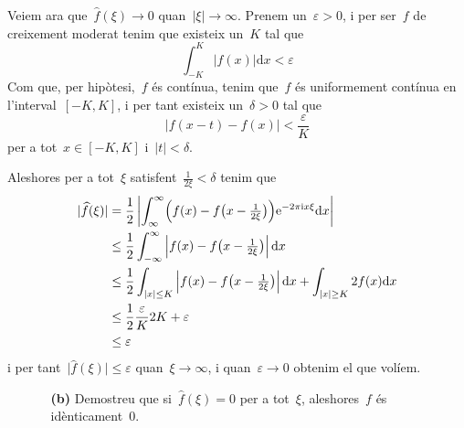 \documentclass[a4paper]{article}
\theoremstyle{definition}
\newcommand{\iu}{\mathrm{i}}
\newcommand{\e}{\mathrm{e}}
\providecommand{\uppi}{\pi}
\newcommand{\diff}{\mathrm{d}}
\newcommand{\abs}[1]{\lvert{#1}\rvert}
\newcommand{\Abs}[1]{\left\lvert{#1}\right\rvert}
\begin{document}
Veiem ara que~\(\widehat{f}(\xi)\to0\) quan~\(\abs{\xi}\to\infty\).
Prenem un~\(\varepsilon>0\), i per ser~\(f\) de creixement moderat tenim que
existeix un~\(K\) tal que
\[
    \int_{-K}^{K} \abs{f(x)} \diff x < \varepsilon
\]
Com que, per hipòtesi,~\(f\) és contínua, tenim que~\(f\) és uniformement
contínua en l'interval~\([-K,K]\), i per tant existeix un~\(\delta>0\) tal que
\[
    \abs{f(x - t) - f(x)} < \frac{\varepsilon}{K}
\]
per a tot~\(x\in[-K,K]\) i~\(\abs{t}<\delta\).

Aleshores per a tot~\(\xi\) satisfent~\(\frac{1}{2\xi}<\delta\) tenim que
\begin{align*}
    \abs{\widehat{f}(\xi)} &= \frac{1}{2} \Abs{\int_{\infty}^{\infty}
                              \Bigl(
                                  f(x) - f\bigl(
                                      x - {\textstyle\frac{1}{2\xi}}
                                  \bigr)
                              \Bigr)
                              \e^{-2\uppi\iu x\xi}
                              \diff x} \\
                           &\leq \frac{1}{2} \int_{-\infty}^{\infty}
                              \Abs{f(x) - f\bigl(
                                      x - {\textstyle\frac{1}{2\xi}}
                              \bigr)}
                              \diff x \\
                           &\leq \frac{1}{2} \int_{\abs{x}\leq K}
                              \Abs{f(x) - f\bigl(
                                      x - {\textstyle\frac{1}{2\xi}}
                              \bigr)}
                              \diff x
                              +
                              \int_{\abs{x}\geq K}
                              2f(x)
                              \diff x \\
                           &\leq \frac{1}{2}
                              \frac{\varepsilon}{K}2K
                              +\varepsilon \\
                           &\leq \varepsilon
\end{align*}
i per tant~\(\abs{\widehat{f}(\xi)} \leq \varepsilon\) quan~\(\xi\to\infty\), i
quan~\(\varepsilon\to0\) obtenim el que volíem.

\clearpage
\begin{enumerate}
    \item[]\begin{enumerate}
        \item[\textbf{(b)}] Demostreu que si~\(\widehat{f}(\xi) = 0\) per a
            tot~\(\xi\), aleshores~\(f\) és idènticament~\(0\).
    \end{enumerate}
\end{enumerate}
\end{document}
